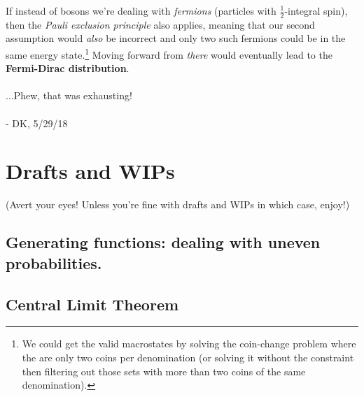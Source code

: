 \documentclass[letterpaper,12pt]{report}
\begin{document}
If instead of bosons we're dealing with \emph{fermions} (particles with
\(\frac{1}{2}\)-integral spin), then the \emph{Pauli exclusion principle} also applies,
meaning that our second assumption would \emph{also} be incorrect and only two such
fermions could be in the same energy state.\footnote{
  We could get the valid macrostates
  by solving the coin-change problem where the are only two coins per denomination
  (or solving it without the constraint then filtering out those sets with more than
  two coins of the same denomination).
}
Moving forward from \emph{there} would
eventually lead to the \textbf{Fermi-Dirac distribution}.
\\
\\
...Phew, that was exhausting!
\\
\\
- DK, 5/29/18


\chapter{Drafts and WIPs}\label{drafts-and-wips}

(Avert your eyes! Unless you're fine with drafts and WIPs \textemdash{} in which case, enjoy!)






\section{Generating functions: dealing with uneven probabilities.}\label{sec:generating-functions} %














\section{Central Limit Theorem} %
\end{document}
